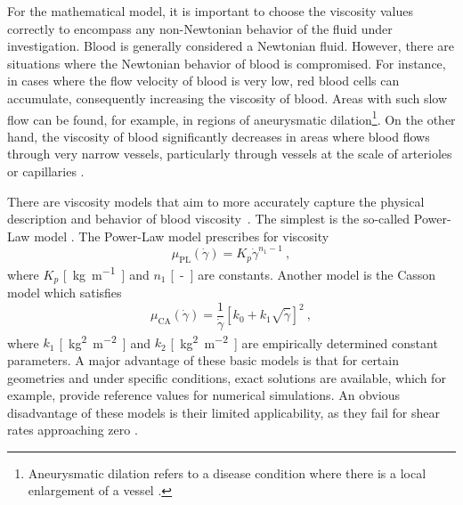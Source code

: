 For the mathematical model, it is important to choose the viscosity values correctly to encompass any non-Newtonian behavior of the fluid under investigation. Blood is generally considered a Newtonian fluid. However, there are situations where the Newtonian behavior of blood is compromised. For instance, in cases where the flow velocity of blood is very low, red blood cells can accumulate, consequently increasing the viscosity of blood.
Areas with such slow flow can be found, for example, in regions of aneurysmatic dilation\footnote{Aneurysmatic dilation refers to a disease condition where there is a local enlargement of a vessel \cite{Syed1997}.}. On the other hand, the viscosity of blood significantly decreases in areas where blood flows through very narrow vessels, particularly through vessels at the scale of arterioles or capillaries \cite{Saloner2019}.

There are viscosity models that aim to more accurately capture the physical description and behavior of blood viscosity~\cite{Saloner2019, Eichler2023, Boyd2007}. The simplest is the so-called Power-Law model \cite{Sequeira}. The Power-Law model prescribes for viscosity
\begin{equation}\label{eq:power-law}
	\mu _{\text{PL}} (\dot{\gamma}) = K_p  \dot{\gamma} ^{n_1-1} \ ,
\end{equation}
where $ K_p$ \si{[kg.m^{-1}]} and $ n_1 $ \si{[-]} are constants. Another model is the Casson model \cite{Boyd2007} which satisfies
\begin{equation}\label{eq:Casson}
	\mu _{\text{CA}} (\dot{\gamma}) = \frac{1}{\dot{\gamma}} \left[ k_{0} + k_{1} \sqrt{\dot{\gamma}} \right]^2 \ ,
\end{equation}
where $ k_1$ \si{[kg^{2}.m^{-2}]} and $ k_2 $ \si{[kg^{2}.m^{-2}]} are empirically determined constant parameters. A major advantage of these basic models is that for certain geometries and under specific conditions, exact solutions are available, which for example, provide reference values for numerical simulations. An obvious disadvantage of these models is their limited applicability, as they fail for shear rates approaching zero \cite{Boyd2007}.

